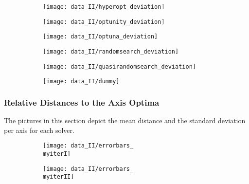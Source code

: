 \begin{figure}[h]
	\begin{subfigure}{0.5\textwidth}
		\texttt{[image: data\_II/hyperopt\_deviation]}
		\label{fig:hyperopt_deviation_II}
	\end{subfigure}
	\begin{subfigure}{0.5\textwidth}
		\texttt{[image: data\_II/optunity\_deviation]}
		\label{fig:optunity_deviation_II}
	\end{subfigure}
\end{figure}

\begin{figure}[h]
	\begin{subfigure}{0.5\textwidth}
		\texttt{[image: data\_II/optuna\_deviation]} 
		\label{fig:optuna_deviation_II}
	\end{subfigure}
	\begin{subfigure}{0.5\textwidth}
		\texttt{[image: data\_II/randomsearch\_deviation]}
		\label{fig:randomsearch_deviation_II}
	\end{subfigure}
\end{figure}

\begin{figure}[h]
	\begin{subfigure}{0.5\textwidth}
		\texttt{[image: data\_II/quasirandomsearch\_deviation]} 
		\label{fig:quasirandomsearch_deviation_II}
	\end{subfigure}
	\begin{subfigure}{0.5\textwidth}
		\texttt{[image: data\_II/dummy]}
		\label{fig:dummy2_II}
	\end{subfigure}
\end{figure}


\newpage


\subsubsection{Relative Distances to the Axis Optima}

The pictures in this section depict the mean distance and the standard deviation per axis for each solver.

\begin{figure}[h]
	\begin{subfigure}{0.5\textwidth}
		\texttt{[image: data\_II/errorbars\_\\myiterI]}
		\label{fig:errorbars_\myiterI_II}
	\end{subfigure}
	\begin{subfigure}{0.5\textwidth}
		\texttt{[image: data\_II/errorbars\_\\myiterII]}
		\label{fig:errorbars_\myiterII_II}
	\end{subfigure}
\end{figure}


